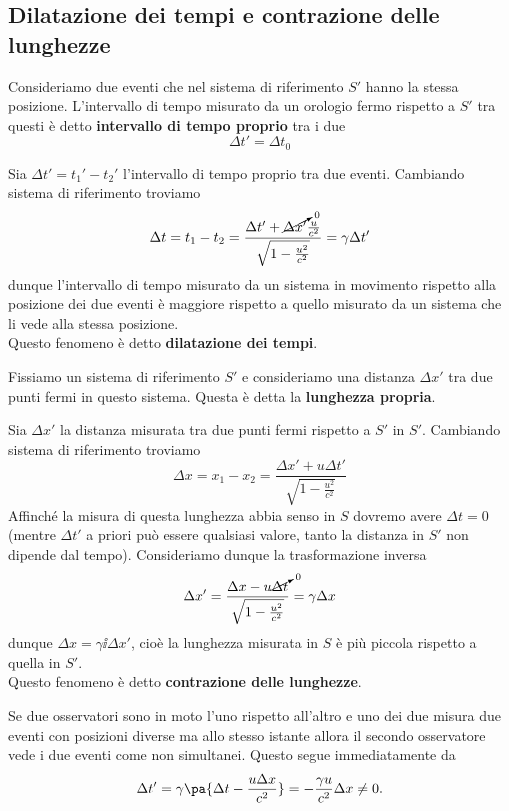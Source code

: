 \subsection{Dilatazione dei tempi e contrazione delle lunghezze}
\begin{definition}
Consideriamo due eventi che nel sistema di riferimento $S'$ hanno la stessa posizione. L'intervallo di tempo misurato da un orologio fermo rispetto a $S'$ tra questi \`e detto \textbf{intervallo di tempo proprio} tra i due
\[\Delta t'=\Delta t_0\]
\end{definition}

\noindent
Sia $\Delta t'=t_1'-t_2'$ l'intervallo di tempo proprio tra due eventi. Cambiando sistema di riferimento troviamo
\[\Delta t=t_1-t_2=\frac{\Delta t'+\cancelto0{\Delta x'} \frac{u}{c^2}}{\sqrt{1-\frac {u^2}{c^2}}}=\gamma \Delta t'\]
dunque l'intervallo di tempo misurato da un sistema in movimento rispetto alla posizione dei due eventi \`e maggiore rispetto a quello misurato da un sistema che li vede alla stessa posizione.\\
Questo fenomeno \`e detto \textbf{dilatazione dei tempi}.
\bigskip


\begin{definition}
Fissiamo un sistema di riferimento $S'$ e consideriamo una distanza $\Delta x'$ tra due punti fermi in questo sistema. Questa \`e detta la \textbf{lunghezza propria}.
\end{definition}
Sia $\Delta x'$ la distanza misurata tra due punti fermi rispetto a $S'$ in $S'$. Cambiando sistema di riferimento troviamo
\[\Delta x=x_1-x_2=\frac{\Delta x'+u\Delta t'}{\sqrt{1-\frac{u^2}{c^2}}}\]
Affinch\'e la misura di questa lunghezza abbia senso in $S$ dovremo avere $\Delta t=0$ (mentre $\Delta t'$ a priori pu\`o essere qualsiasi valore, tanto la distanza in $S'$ non dipende dal tempo). Consideriamo dunque la trasformazione inversa
\[\Delta x'=\frac{\Delta x-u\cancelto0{\Delta t}}{\sqrt{1-\frac{u^2}{c^2}}}=\gamma \Delta x\]
dunque $\Delta x=\gamma\ii \Delta x'$, cio\`e la lunghezza misurata in $S$ \`e pi\`u piccola rispetto a quella in $S'$.\\
Questo fenomeno \`e detto \textbf{contrazione delle lunghezze}.

\begin{example}
Se due osservatori sono in moto l'uno rispetto all'altro e uno dei due misura due eventi con posizioni diverse ma allo stesso istante allora il secondo osservatore vede i due eventi come non simultanei. Questo segue immediatamente da
\[\Delta t'=\gamma\pa{\Delta t-\frac{u\Delta x}{c^2}}=-\frac{\gamma u}{c^2} \Delta x\neq 0.\]
\end{example}



